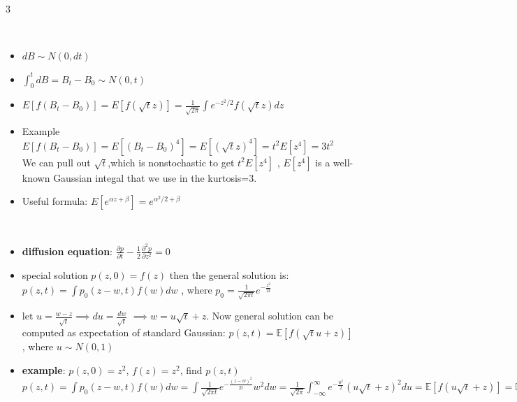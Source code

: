 \documentclass[10pt,landscape,a4paper]{article}
\begin{document}
\begin{multicols*}{3}
\begin{description}[topsep=0pt]
	\item[Expectations from Brownian integrals] ~
	\begin{itemize}[topsep=0pt]
		\item $ dB \sim N(0,dt) $
		\item $  \int_{0}^{t} dB = B_t - B_0 \sim N(0,t ) $
		\item $E[f(B_t-B_0)] = E[f(\sqrt{t} z)] = \frac{1}{\sqrt{2\pi}} \int e^{-z^2/2}f(\sqrt{t}z) dz$ 
		\item Example  $E[f(B_t-B_0)] = E[(B_t-B_0)^4] = E[(\sqrt{t} z)^4] = t^2 E[z^4] = 3t^2 $ \\
		
		We can pull out $\sqrt{t}$,which is nonstochastic to get $t^2 E[z^4]$
		, $E[z^4]$ is a well-known Gaussian integal that we use in the kurtosis=3.
		\item Useful formula:  $E[e^{\alpha z + \beta}]  = e^{\alpha^2/2 + \beta}$
	\end{itemize}
\end{description}

\begin{description}[topsep=0pt]
	\item[Solutions to the diffusion equation] ~
	\begin{itemize}[topsep=0pt]
		\item \textbf{diffusion equation}: $ \frac{\partial p}{\partial t} - \frac{1}{2} \frac{\partial ^2 p}{\partial z^2} = 0 $
		\item special solution $p(z,0)=f(z)$ then the general solution is: $ p(z,t) = \int p_0(z-w,t)f(w)dw $ , where 
		$ p_0 = \frac{1}{\sqrt{2 \pi t}} e^{-\frac{z^2}{2t}} $
		\item  $ \text{let } u=\frac{w-z}{\sqrt{t}}  \implies  du=\frac{dw}{\sqrt{t}} $
		$ \implies  w=u \sqrt{t} + z $.  Now general solution can be computed as expectation of standard Gaussian: $p(z,t) = \mathbb{E}[f(\sqrt{t}u+z)]$ , where $u \sim N(0,1) $
		\item \textbf{example}: $p(z,0) = z^2 $, $ f(z) = z^2 $, find $ p(z,t) $ \\
		$p(z,t) = \int p_0(z-w,t)f(w)dw = \int  \frac{1}{\sqrt{2 \pi t}} e^{-\frac{(z-w)^2}{2t}} w^2 dw =  \frac{1}{\sqrt{2 \pi}} \int_{-\infty}^{\infty}  e^{-\frac{u^2}{2}} (u \sqrt{t} + z)^2 du =  \mathbb{E} [f(u \sqrt{t} + z)] =  \mathbb{E}[u^2t + 2u \sqrt{t}z + z^2] =  z^2+t $
		
	\end{itemize}
\end{description}


\end{multicols*}
\end{document}
